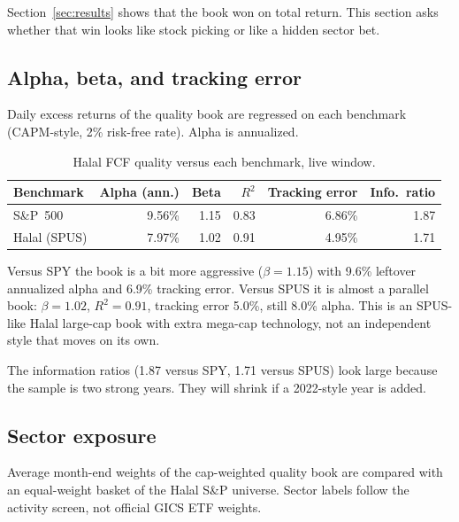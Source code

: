 \documentclass[11pt,letterpaper]{article}
\begin{document}
Section~\ref{sec:results} shows that the book won on total return. This section asks whether that win looks like stock picking or like a hidden sector bet.

\subsection{Alpha, beta, and tracking error}

Daily excess returns of the quality book are regressed on each benchmark (CAPM-style, 2\% risk-free rate). Alpha is annualized.

\begin{table}[htbp]
\centering
\caption{Halal FCF quality versus each benchmark, live window.}
\label{tab:capm}
\begin{tabular}{lrrrrr}
\toprule
Benchmark & Alpha (ann.) & Beta & $R^2$ & Tracking error & Info.\ ratio \\
\midrule
S\&P~500     & 9.56\% & 1.15 & 0.83 & 6.86\% & 1.87 \\
Halal (SPUS) & 7.97\% & 1.02 & 0.91 & 4.95\% & 1.71 \\
\bottomrule
\end{tabular}
\end{table}

Versus SPY the book is a bit more aggressive ($\beta = 1.15$) with 9.6\% leftover annualized alpha and 6.9\% tracking error. Versus SPUS it is almost a parallel book: $\beta = 1.02$, $R^2 = 0.91$, tracking error 5.0\%, still 8.0\% alpha. This is an SPUS-like Halal large-cap book with extra mega-cap technology, not an independent style that moves on its own.

The information ratios (1.87 versus SPY, 1.71 versus SPUS) look large because the sample is two strong years. They will shrink if a 2022-style year is added.

\subsection{Sector exposure}

Average month-end weights of the cap-weighted quality book are compared with an equal-weight basket of the Halal S\&P universe. Sector labels follow the activity screen, not official GICS ETF weights.
\end{document}
